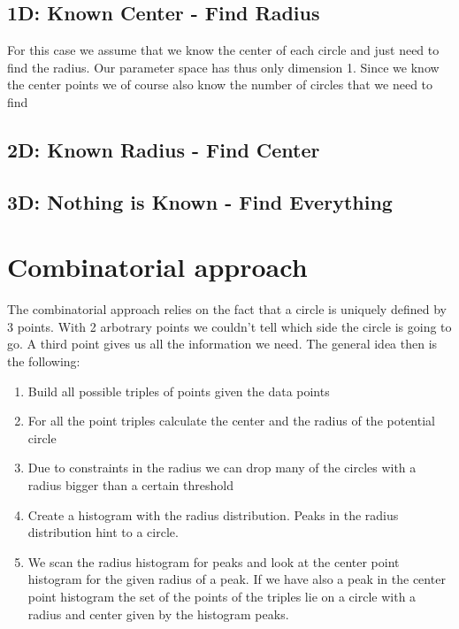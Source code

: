 \documentclass[10pt,twoside]{scrreprt}
\begin{document}
\subsection{1D: Known Center - Find Radius} %
\label{sub:1d_known_center_find_radius}

For this case we assume that we know the center of each circle and just need to find the radius. Our parameter space has thus only dimension 1. Since we know the center points we of course also know the number of circles that we need to find


\subsection{2D: Known Radius - Find Center} %
\label{sub:2d_known_radius_find_center}


\subsection{3D: Nothing is Known - Find Everything} %
\label{sub:3d_nothing_is_known_find_everything}


\section{Combinatorial approach}

The combinatorial approach relies on the fact that a circle is uniquely defined by 3 points. With 2 arbotrary points we couldn't tell which side the circle is
going to go. A third point gives us all the information we need. The general idea then is the following:

\begin{enumerate}
\item Build all possible triples of points given the data points
\item For all the point triples calculate the center and the radius of the potential circle
\item Due to constraints in the radius we can drop many of the circles with a radius bigger than a certain threshold
\item Create a histogram with the radius distribution. Peaks in the radius distribution hint to a circle.
\item We scan the radius histogram for peaks and look at the center point histogram for the given radius of a peak. If we have also a peak in the center point histogram
      the set of the points of the triples lie on a circle with a radius and center given by the histogram peaks.
\end{enumerate}
\end{document}
